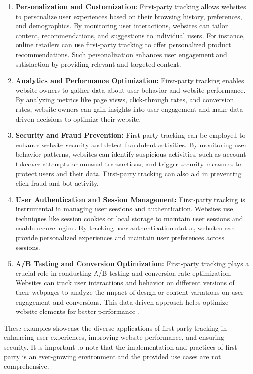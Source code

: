 \begin{enumerate}
  \item{\textbf{Personalization and Customization:} First-party tracking allows websites to personalize user experiences based on their browsing history,
    preferences, and demographics. By monitoring user interactions, websites can tailor content,
    recommendations, and suggestions to individual users. For instance, online retailers can use first-party
    tracking to offer personalized product recommendations. Such personalization enhances user engagement
    and satisfaction by providing relevant and targeted content.
    }
  \item{\textbf{Analytics and Performance Optimization:} First-party tracking enables website owners to gather data about user behavior and website performance.
    By analyzing metrics like page views, click-through rates, and conversion rates, website owners can gain
    insights into user engagement and make data-driven decisions to optimize their website.
    }
  \item{\textbf{Security and Fraud Prevention:} First-party tracking can be employed to enhance website security and detect fraudulent
    activities. By monitoring user behavior patterns, websites can identify suspicious activities, such as account takeover
    attempts or unusual transactions, and trigger security measures to protect users and their data.
    First-party tracking can also aid in preventing click fraud and bot activity.
  }
  \item{\textbf{User Authentication and Session Management:} First-party tracking is instrumental in managing user sessions and authentication.
    Websites use techniques like session cookies or local storage to maintain user sessions and enable secure logins.
    By tracking user authentication status, websites can provide personalized experiences and maintain user preferences across sessions.
  }
  \item{\textbf{A/B Testing and Conversion Optimization:} First-party tracking plays a crucial role in conducting A/B testing and
    conversion rate optimization. Websites can track user interactions and behavior on different versions of their webpages
    to analyze the impact of design or content variations on user engagement and conversions. This data-driven approach
    helps optimize website elements for better performance \cite{siroker2015b}.
  }
\end{enumerate}
These examples showcase the diverse applications of first-party tracking in enhancing user experiences, improving website performance,
and ensuring security. It is important to note that the implementation and practices of first-party is an ever-growing environment and the 
provided use cases are not comprehensive.
